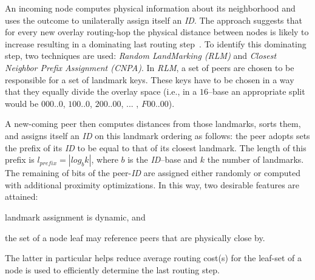 An incoming node computes physical information about its neighborhood
and uses the outcome to unilaterally assign itself an \emph{ID}.
The approach suggests that for every new overlay routing-hop 
the physical distance between nodes is likely to increase
resulting in a dominating
last routing step~\cite{antony_pastry_2001,CDCR2002a}.
To identify this dominating step, two techniques are used: 
\emph{Random LandMarking (RLM)} and 
\emph{Closest Neighbor Prefix Assignment (CNPA)}.
In \emph{RLM}, a set of peers are chosen to be responsible 
for a set of landmark keys. These keys have to be chosen in a way that they
equally divide the overlay space (i.e., in a $16$--base an appropriate split
would be $000..0$, $100..0$, $200..00$, ... , $F00..00$).
%

A new-coming peer then computes distances from those landmarks,
sorts them, and assigns itself an \emph{ID} on this 
landmark ordering as follows:
the peer adopts sets the prefix of its \emph{ID} to be equal to that 
of its closest landmark.
The length of this prefix is 
$l_{prefix}=|log_b k|$, where $b$ is the \emph{ID}--base 
and $k$ the number of landmarks. 
The remaining of bits of the peer-\emph{ID} are assigned either 
randomly or computed with additional proximity optimizations.
In this way, two desirable features are attained:
\begin{inparaenum}
  \item landmark assignment is dynamic, and
  \item the set of a node leaf may reference peers that are 
	physically close by.
\end{inparaenum}
The latter in particular helps reduce average routing cost(s)
for the leaf-set of a node is used to efficiently determine the 
last routing step.

